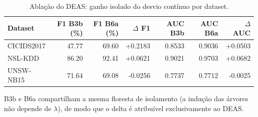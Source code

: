 \begin{table}[htbp]
\centering
\caption{Ablação do DEAS: ganho isolado do desvio contínuo por dataset.}
\label{tab:ablacao-deas}
\small
\begin{tabular}{lrrrrrr}
\hline
Dataset & F1 B3b (\%) & F1 B6a (\%) & $\Delta$ F1 & AUC B3b & AUC B6a & $\Delta$ AUC \\
\hline
CICIDS2017 & 47.77 & 69.60 & +0.2183 & 0.8533 & 0.9036 & +0.0503 \\
NSL-KDD & 86.20 & 92.41 & +0.0621 & 0.9021 & 0.9703 & +0.0682 \\
UNSW-NB15 & 71.64 & 69.08 & -0.0256 & 0.7737 & 0.7712 & -0.0025 \\
\hline
\end{tabular}
\begin{flushleft}\footnotesize B3b e B6a compartilham a mesma floresta de isolamento (a indução das árvores não depende de $\lambda$), de modo que o delta é atribuível exclusivamente ao DEAS.\end{flushleft}
\end{table}
